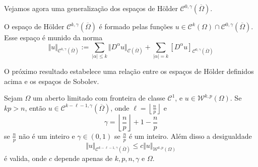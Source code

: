 \documentclass[a4paper, 11pt]{book}
\theoremstyle{definition}
\newcommand{\cC}{\mathcal{C}}
\newcommand{\cW}{\mathcal{W}}
\begin{document}
Vejamos agora uma generalização dos espaços de Hölder $\cC^{0,\gamma}(\overline \Omega)$.

\begin{dbox}
    O espaço de Hölder $\cC^{k,\gamma}(\overline\Omega)$ é formado pelas funções $u \in \cC^k(\Omega) \cap \cC^{0,\gamma}(\overline\Omega)$. Esse espaço é munido da norma
    \[
        \Vert u \Vert_{\cC^{k,\gamma}(\overline\Omega)} := \sum_{|\alpha| \leqslant k} \Vert D^{\alpha}u \Vert_{\cC(\overline\Omega)} + \sum_{|\alpha| = k} [D^\alpha u]_{\cC^{0,\gamma}(\overline\Omega)}
    \] 
\end{dbox}

O próximo resultado estabelece uma relação entre os espaços de Hölder definidos acima e os espaços de Sobolev.

\begin{tbox} \label{thm:geral2}
    Sejam $\Omega$ um aberto limitado com fronteira de classe $\cC^1$, e $u \in \cW^{k,p}(\Omega)$. 
    Se $kp > n$, então $u \in \cC^{k - \ell - 1,\gamma}(\overline\Omega)$, onde $\ell = \left\lfloor \frac{n}{p} \right\rfloor$ e
    \[
        \gamma = \left\lfloor \frac{n}{p} \right\rfloor + 1 - \frac{n}{p}
    \]
    se $\frac{n}{p}$ não é um inteiro e $\gamma \in (0,1)$ se $\frac{n}{p}$ é um inteiro.
    Além disso a desigualdade
    \begin{equation} \label{eq:geral2}
        \Vert u \Vert_{\cC^{k - \ell - 1,\gamma}(\overline\Omega)} \leqslant c \Vert u \Vert_{\cW^{k,p}(\Omega)}
    \end{equation}
    é valida, onde $c$ depende apenas de $k, p, n, \gamma$ e $\Omega$.
\end{tbox}
\end{document}
